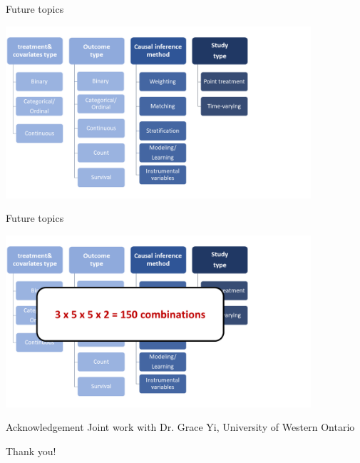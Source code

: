 \documentclass[12pt,aspectratio=169]{beamer}
\begin{document}
\begin{frame}{Future topics}
 \begin{center}
     \includegraphics[width=0.85\textwidth]{fi3.png}
     \end{center}
\end{frame}


\begin{frame}{Future topics}
 \begin{center}
     \includegraphics[width=0.85\textwidth]{fi4.png}
     \end{center}
\end{frame}





\begin{frame}{Acknowledgement}
 Joint work with Dr. Grace Yi,  University of Western Ontario
\end{frame}




\begin{frame}{Thank you!}
 \begin{center}
 
 \Large{}
 
 \end{center}
\end{frame}
\end{document}
